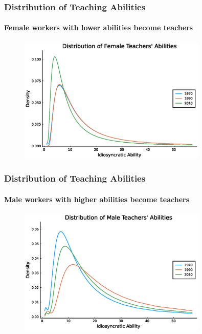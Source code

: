 \documentclass[11pt]{beamer}
\begin{document}
\begin{frame}
\frametitle{Distribution of Teaching Abilities}
\framesubtitle{Female workers with lower abilities become teachers}
\label{femaleabil}
\begin{figure}
 \begin{center}
\includegraphics[width=0.8\textwidth]{fT_women_steadystate.eps}
 			\label{ }
 		\end{center}
 	\end{figure}
  \hyperlink{res}{}
\end{frame}

\begin{frame}
\frametitle{Distribution of Teaching Abilities}
\framesubtitle{Male workers with higher abilities become teachers}
\label{maleabil}
\begin{figure}
 		\begin{center}
\includegraphics[width=0.8\textwidth]{fT_men_steadystate.eps}
 			\label{ }
 		\end{center}
 	\end{figure}
    \hyperlink{res}{}
\end{frame}
\end{document}

